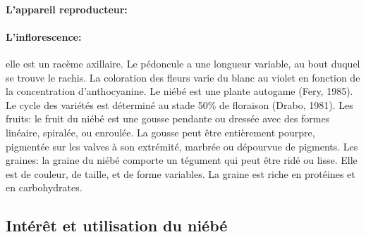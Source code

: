 \documentclass[a4paper,11pt]{article}
\begin{document}
\paragraph{L’appareil reproducteur:}


\paragraph{L’inflorescence:} elle est un racème axillaire. Le pédoncule a une
longueur variable, au bout duquel se trouve le rachis. La coloration
des fleurs varie du blanc au violet en fonction de la concentration
d’anthocyanine. Le niébé est une plante autogame (Fery, 1985). Le cycle des
variétés est déterminé au stade 50\% de floraison (Drabo,
1981).  Les fruits: le fruit du niébé est une gousse pendante ou
dressée avec des formes linéaire, spiralée, ou enroulée. La gousse
peut être entièrement pourpre, pigmentée sur les valves à son
extrémité, marbrée ou dépourvue de pigments.  Les graines: la graine
du niébé comporte un tégument qui peut être ridé ou lisse. Elle est de
couleur, de taille, et de forme variables. La graine est riche en
protéines et en carbohydrates\cite{Doggett_1988}.

\subsection{Intérêt et utilisation du niébé}
\end{document}
